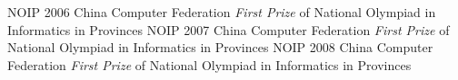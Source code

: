 \documentclass[]{friggeri-cv} %
\begin{document}
\begin{entrylist}
  {NOIP 2006}
  {China Computer Federation}
  {\emph{First Prize} of National Olympiad in Informatics in Provinces}
  {NOIP 2007}
  {China Computer Federation}
  {\emph{First Prize} of National Olympiad in Informatics in Provinces}
  {NOIP 2008}
  {China Computer Federation}
  {\emph{First Prize} of National Olympiad in Informatics in Provinces}
\end{entrylist}
\end{document}
